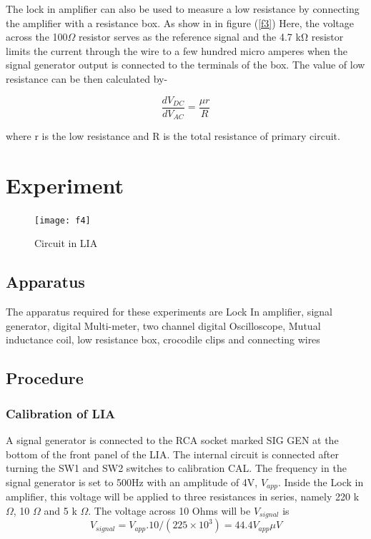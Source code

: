 \documentclass[a4paper, amsfonts, amssymb, amsmath, reprint, showkeys, nofootinbib, twoside]{revtex4-1}
\begin{document}
The lock in amplifier can also be used to measure a low resistance by connecting the amplifier with a resistance box. As show in in figure (\ref{f3}) Here, the voltage across the 100$\Omega$ resistor serves as
the reference signal and the 4.7 kΩ resistor limits the current through the wire to a few hundred micro amperes when the signal generator output is connected to the terminals of the box. The value of low resistance can be then calculated by-

\begin{equation}
	\frac{d V_{DC}}{dV_{AC}}=\frac{\mu r}{R}
\end{equation}

where r is the low resistance and R is the total resistance of primary circuit.

\section{Experiment}
\begin{figure}[h]
	\centering
	\texttt{[image: f4]} 
	\caption{Circuit in LIA}
	\label{f4}
\end{figure}
\subsection{Apparatus}
The apparatus required for these experiments are Lock In amplifier, signal generator, digital Multi-meter, two channel digital Oscilloscope, Mutual inductance coil, low resistance box, crocodile clips and connecting wires
\subsection{Procedure}
\subsubsection{Calibration of LIA}
 A signal generator is connected to the RCA socket marked SIG GEN at the bottom of the front panel of the LIA. The internal circuit is connected after turning the SW1 and SW2 switches to calibration CAL. The frequency in the signal generator is set to 500Hz with an amplitude of 4V, $V_{app}$. Inside the Lock in amplifier, this voltage will be applied to three resistances in
 series, namely 220 k $\Omega$, 10 $\Omega$ and 5 k $\Omega$. The voltage across 10 Ohms will be  $V_{signal}$ is
 \begin{equation}
 	V_{signal}=V_{app}.10/(225\times10^3)=44.4 V_{app} \mu V
 \end{equation}
 
\end{document}
